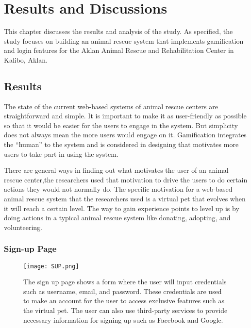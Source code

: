 \chapter{Results and Discussions}
This chapter discusses the results and analysis of the study. As specified, the study focuses on building an animal rescue system that implements gamification and login features for the Aklan Animal Rescue and Rehabilitation Center in Kalibo, Aklan. 

\section{Results}

The state of the current web-based systems of animal rescue centers are straightforward
and simple. It is important to make it as user-friendly as possible so that
it would be easier for the users to engage in the system. But simplicity does
not always mean the more users would engage on it. Gamification integrates the
“human” to the system and is considered in designing that motivates more
users to take part in using the system.

There are general ways in finding out what motivates the user of an animal
rescue center,the researchers used that motivation to drive the users to do certain actions they would not normally do. The specific motivation for a web-based animal
rescue system that the researchers used is a virtual pet that evolves when it will reach a certain
level. The way to gain experience points to level up is by doing actions in a typical
animal rescue system like donating, adopting, and volunteering.

\subsection{Sign-up Page}


\begin{figure}[h]                %
	\centering                    %
	\texttt{[image: SUP.png]}      %
	\caption{The sign up page shows a form where the user will input credentials
		such as username, email, and password. These credentials are used to make an
		account for the user to access exclusive features such as the virtual pet. The user
		can also use third-party services to provide necessary information for signing up
		such as Facebook and Google.}
	\label{fig:disneystock}
	
\end{figure}

